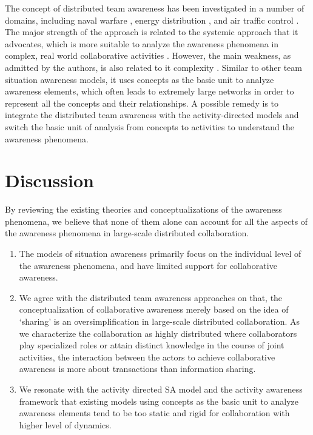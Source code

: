The concept of distributed team awareness has been investigated in a number of domains, including naval warfare \cite{Stanton2006}, energy distribution \cite{Salmon2008a}, and air traffic control \cite{Stanton2009}. The major strength of the approach is related to the systemic approach that it advocates, which is more suitable to analyze the awareness phenomena in complex, real world collaborative activities \cite{Stanton2009}. However, the main weakness, as admitted by the authors, is also related to it complexity \cite{Salmon2010}. Similar to other team situation awareness models, it uses concepts as the basic unit to analyze awareness elements, which often leads to extremely large networks in order to represent all the concepts and their relationships. A possible remedy is to integrate the distributed team awareness with the activity-directed models and switch the basic unit of analysis from concepts to activities to understand the awareness phenomena.

\section{Discussion} %
\label{sec:discussion}
By reviewing the existing theories and conceptualizations of the awareness phenomena, we believe that none of them alone can account for all the aspects of the awareness phenomena in large-scale distributed collaboration. 

\begin{enumerate}
   \item The models of situation awareness primarily focus on the individual level of the awareness phenomena, and have limited support for collaborative awareness. 
   \item We agree with the distributed team awareness approaches \cite{Salmon2010} on that, the conceptualization of collaborative awareness merely based on the idea of `sharing' is an oversimplification in large-scale distributed collaboration. As we characterize the collaboration as highly distributed where collaborators play specialized roles or attain distinct knowledge in the course of joint activities, the interaction between the actors to achieve collaborative awareness is more about transactions than information sharing.
   \item We resonate with the activity directed SA model \cite{Bedny1999} and the activity awareness framework \cite{carroll2003a} that existing models using concepts as the basic unit to analyze awareness elements tend to be too static and rigid for collaboration with higher level of dynamics.
\end{enumerate}

